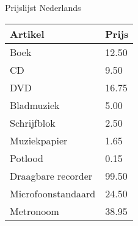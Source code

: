 \documentclass[a4paper]{article}
\begin{document}
\Large{Prijslijst Nederlands}

\vspace{8mm}

\begin{tabular}{ll}\\ \hline
{\bfseries Artikel} &
{\bfseries Prijs} \\ \hline\hline
Boek &12.50 \\CD &9.50 \\DVD &16.75 \\Bladmuziek &5.00 \\Schrijfblok &2.50 \\Muziekpapier &1.65 \\Potlood &0.15 \\Draagbare recorder &99.50 \\Microfoonstandaard &24.50 \\Metronoom &38.95\\\hline
\end{tabular}
\end{document}
